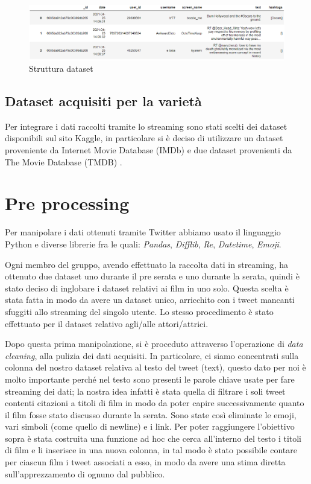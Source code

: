 \documentclass[11pt,a4paper]{report}
\begin{document}
	\begin{figure}[h]
			\centering
			\includegraphics[width=0.9\linewidth]{imgs/struttura dataset.png}
			\caption{Struttura dataset}
			\label{fig:Struttura dataset}
		\end{figure}
\section{Dataset acquisiti per la varietà}
Per integrare i dati raccolti tramite lo streaming sono stati scelti dei dataset disponibili sul sito Kaggle, in particolare si è deciso di utilizzare un dataset proveniente da Internet Movie Database (IMDb) e due dataset provenienti da The Movie Database (TMDB) \cite{noauthor_imdb_nodate} \cite{noauthor_tmdb_nodate-1} \cite{noauthor_tmdb_nodate}.

\chapter{Pre processing}
Per manipolare i dati ottenuti tramite Twitter abbiamo usato il linguaggio Python e diverse librerie fra le quali: \textit{Pandas}, \textit{Difflib}, \textit{Re}, \textit{Datetime}, \textit{Emoji}.

Ogni membro del gruppo, avendo effettuato la raccolta dati in streaming, ha ottenuto due dataset uno durante il pre serata e uno durante la serata, quindi è stato deciso di inglobare i dataset relativi ai film in uno solo. Questa scelta è stata fatta in modo da avere un dataset unico, arricchito con i tweet mancanti sfuggiti allo streaming del singolo utente. Lo stesso procedimento è stato effettuato per il dataset relativo agli/alle attori/attrici. 

Dopo questa prima manipolazione, si è proceduto attraverso l'operazione di \textit{data cleaning}, alla pulizia dei dati acquisiti. In particolare, ci siamo concentrati sulla colonna del nostro dataset relativa al testo del tweet (text), questo dato per noi è molto importante perché nel testo sono presenti le parole chiave usate per fare streaming dei dati; la nostra idea infatti è stata quella di filtrare i soli tweet contenti citazioni a titoli di film in modo da poter capire successivamente quanto il film fosse stato discusso durante la serata. Sono state così eliminate le emoji, vari simboli (come quello di newline) e i link. Per poter raggiungere l'obiettivo sopra è stata costruita una funzione ad hoc che cerca all'interno del testo i titoli di film e li inserisce in una nuova colonna, in tal modo è stato possibile contare per ciascun film i tweet associati a esso, in modo da avere una stima diretta sull'apprezzamento di ognuno dal pubblico.
\end{document}
